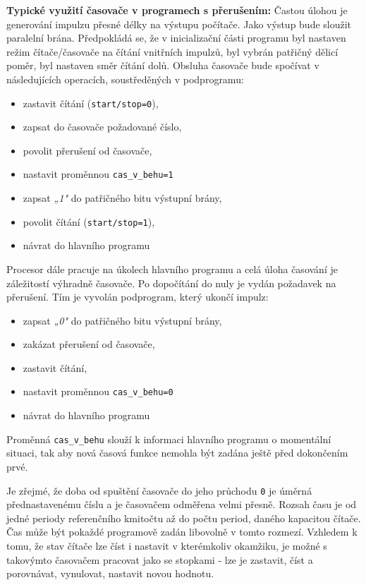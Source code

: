         \textbf{Typické využití časovače v programech s přerušením:} Častou úlohou je generování
        impulzu přesné délky na výstupu počítače. Jako výstup bude sloužit paralelní brána.
        Předpokládá se, že v inicializační části programu byl nastaven režim čítače/časovače na
        čítání vnitřních impulzů, byl vybrán patřičný dělicí poměr, byl nastaven směr čítání dolů.
        Obsluha časovače bude spočívat v následujících operacích, soustředěných v podprogramu:
        \begin{itemize}[noitemsep]
          \item zastavit čítání (\texttt{start/stop=0}),
          \item zapsat do časovače požadované číslo,
          \item povolit přerušení od časovače,
          \item nastavit proměnnou \texttt{cas\_v\_behu=1}
          \item zapsat \emph{„1"} do patřičného bitu výstupní brány,
          \item povolit čítání (\texttt{start/stop=1}),
          \item návrat do hlavního programu 
        \end{itemize}
        
        Procesor dále pracuje na úkolech hlavního programu a celá úloha časování je záležitostí 
        výhradně časovače. Po dopočítání do nuly je vydán požadavek na přerušení. Tím je vyvolán 
        podprogram, který ukončí impulz:
        \begin{itemize}[noitemsep]
          \item zapsat \emph{„0"} do patřičného bitu výstupní brány,
          \item zakázat přerušení od časovače,
          \item zastavit čítání,
          \item nastavit proměnnou \texttt{cas\_v\_behu=0}
          \item návrat do hlavního programu
        \end{itemize}
        
        Proměnná \texttt{cas\_v\_behu} slouží k informaci hlavního programu o momentální situaci, 
        tak aby nová časová funkce nemohla být zadána ještě před dokončením prvé.
        
        Je zřejmé, že doba od spuštění časovače do jeho průchodu \texttt{0} je úměrná 
        přednastavenému číslu a je časovačem odměřena velmi přesně. Rozsah času je od jedné periody 
        referenčního kmitočtu až do počtu period, daného kapacitou čítače. Čas může být pokaždé 
        programově zadán libovolně v tomto rozmezí. Vzhledem k tomu, že stav čítače lze číst i 
        nastavit v kterémkoliv okamžiku, je možné s takovýmto časovačem pracovat jako se stopkami - 
        lze je zastavit, číst a porovnávat, vynulovat, nastavit novou hodnotu.
        
